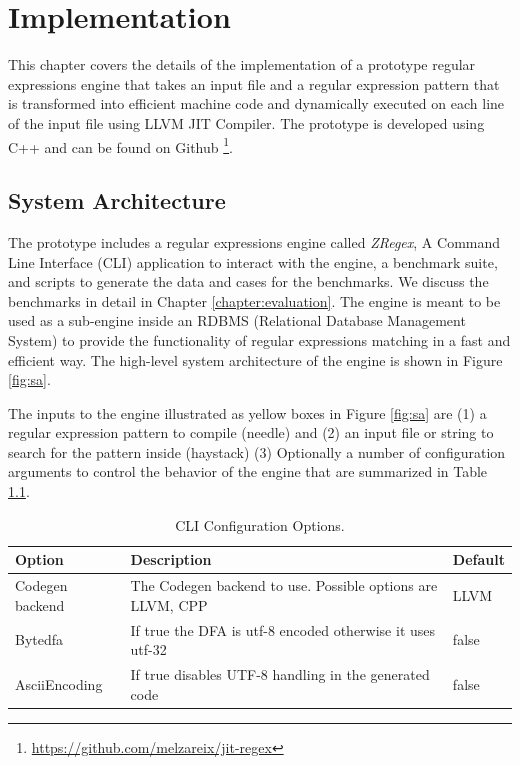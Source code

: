 \chapter{Implementation}\label{chapter:implementation}
This chapter covers the details of the implementation of a prototype regular expressions engine that takes an input file and a regular expression pattern that is transformed into efficient machine code and dynamically executed on each line of the input file using LLVM JIT Compiler. The prototype is developed using C++ and can be found on Github \footnote{\url{https://github.com/melzareix/jit-regex}}.

\section{System Architecture}
The prototype includes a regular expressions engine called \textit{ZRegex}, A Command Line Interface (CLI) application to interact with the engine, a benchmark suite, and scripts to generate the data and cases for the benchmarks. We discuss the benchmarks in detail in Chapter \ref{chapter:evaluation}. The engine is meant to be used as a sub-engine inside an RDBMS (Relational Database Management System) to provide the functionality of regular expressions matching in a fast and efficient way. The high-level system architecture of the engine is shown in Figure \ref{fig:sa}.

The inputs to the engine illustrated as yellow boxes in Figure \ref{fig:sa} are (1) a regular expression pattern to compile (needle) and (2) an input file or string to search for the pattern inside (haystack) (3) Optionally a number of configuration arguments to control the behavior of the engine that are summarized in Table \ref{tab:cliconf}. 

{\renewcommand{\arraystretch}{1.5}%
\begin{table}[htpb]
\centering
\begin{adjustbox}{width=\textwidth,center=\textwidth}
\small
\begin{tabular}{|l|l|l|}
\hline
Option        & Description & Default  \\
\hline
Codegen backend & The Codegen backend to use. Possible options are {LLVM, CPP} & LLVM\\
\hline
Bytedfa & If true the DFA is utf-8 encoded otherwise it uses utf-32 & false \\
\hline
AsciiEncoding & If true disables UTF-8 handling in the generated code & false \\
\hline
\end{tabular}
\end{adjustbox}
\caption[CLI Configuration Options]{CLI Configuration Options.}\label{tab:cliconf}
\end{table}}

